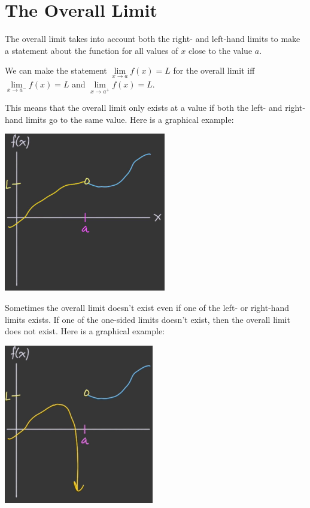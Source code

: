 \documentclass{article}
\begin{document}
\pagebreak
\section{The Overall Limit}
The overall limit takes into account both the right- and left-hand limits to make a statement
about the function for all values of $x$ close to the value $a$.

We can make the statement $\underset{x \rightarrow a}{\lim}f(x) = L$ for the overall limit iff
\\$\underset{x \rightarrow{}a^{-}}{\lim}f (x) = L$ and $\underset{x \rightarrow{}a^{+}}{\lim}f (x) = L$.

This means that the overall limit only exists at a value if both the left- and right-hand limits
go to the same value. Here is a graphical example:
\begin{center}\includegraphics[scale = 0.5]{Images/OverallLimit1.png}\end{center}
Sometimes the overall limit doesn't exist even if one of the left- or right-hand limits exists. If
one of the one-sided limits doesn't exist, then the overall limit does not exist. Here is a graphical
example:
\begin{center}\includegraphics[scale = 0.5]{Images/OverallLimit2.png}\end{center}
\end{document}
